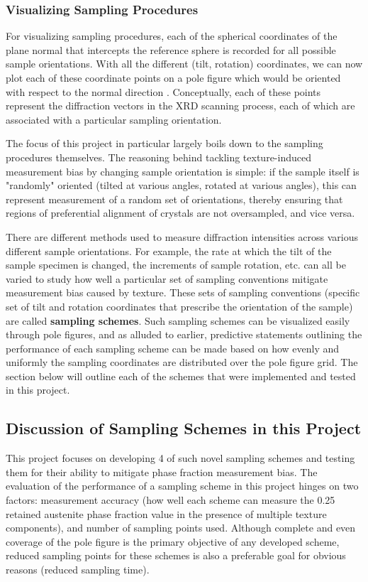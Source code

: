 \documentclass[10pt]{article}
\begin{document}
\subsubsection{Visualizing Sampling Procedures}
For visualizing sampling procedures, each of the spherical coordinates of the plane normal that intercepts the reference 
sphere is recorded for all possible sample orientations.
With all the different (tilt, rotation) coordinates, we can now plot 
each of these coordinate points on a pole figure which would be oriented with respect to the normal direction \cite{ref09}.
Conceptually, each of these points represent the diffraction vectors in the XRD scanning process, each of which are 
associated with a particular sampling orientation. 

The focus of this project in particular largely boils down to the sampling procedures themselves. The reasoning behind tackling 
texture-induced measurement bias by changing sample orientation is simple: if the sample itself is "randomly" oriented (tilted at various angles, rotated
at various angles), this can represent measurement of a random set of orientations, thereby ensuring that regions of preferential 
alignment of crystals are not oversampled, and vice versa.

There are different methods used to
measure diffraction intensities across various different sample orientations. For example, the rate at which the tilt of the sample
specimen is changed, the increments of sample rotation, etc. can all be varied to study how well a particular set of sampling conventions
mitigate measurement bias caused by texture. These sets of sampling conventions (specific set of tilt and rotation coordinates that
prescribe the orientation of the sample) are called \textbf{sampling schemes}. Such sampling schemes can be visualized easily through pole figures, and 
as alluded to earlier, predictive statements outlining the performance
of each sampling scheme can be made based on how evenly and uniformly the sampling coordinates are distributed over the pole figure grid. The section below will
outline each of the schemes that were implemented and tested in this project.
 

\subsection{Discussion of Sampling Schemes in this Project}
This project focuses on developing 4 of such novel sampling schemes and testing them for their ability to mitigate phase fraction 
measurement bias. The evaluation of the performance of a sampling scheme in this project hinges on two factors: measurement accuracy (how well each scheme can measure the 
0.25 retained austenite phase fraction value in the presence of multiple texture components), and number of sampling points used. Although complete and even coverage of the pole 
figure is the primary objective of any developed scheme, reduced sampling points for these schemes is also a preferable goal for obvious reasons (reduced sampling time).
\end{document}
